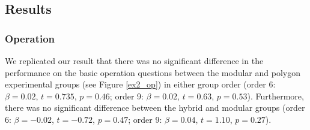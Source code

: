 \documentclass[11pt]{article}
\begin{document}
\subsection{Results}
\subsubsection{Operation}
We replicated our result that there was no significant difference in the performance on the basic operation questions between the modular and polygon experimental groups (see Figure \ref{ex2_op}) in either group order (order 6: $\beta = 0.02$, $t = 0.735$, $p = 0.46$; order 9: $\beta = 0.02$, $t = 0.63$, $p = 0.53$). Furthermore, there was no significant difference between the hybrid and modular groups (order 6: $\beta = -0.02$, $t = -0.72$, $p = 0.47$; order 9: $\beta = 0.04$, $t = 1.10$, $p = 0.27$).
\end{document}
